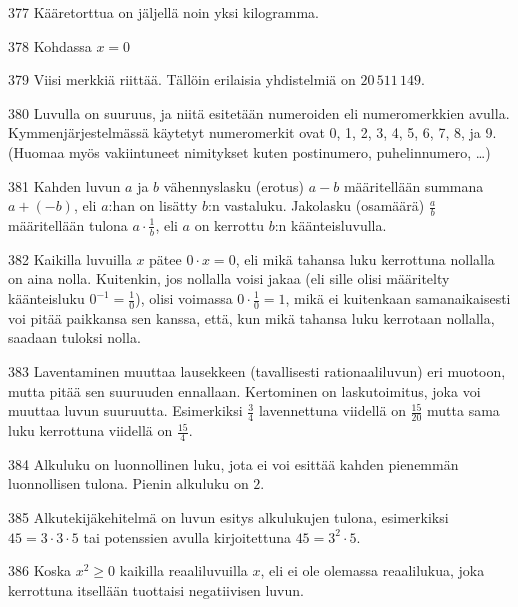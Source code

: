 \begin{Vastaus}{377}
Kääretorttua on jäljellä noin yksi kilogramma.
\end{Vastaus}
\begin{Vastaus}{378}
Kohdassa $x=0$
\end{Vastaus}
\begin{Vastaus}{379}
Viisi merkkiä riittää. Tällöin erilaisia yhdistelmiä on $20\,511\,149$.
\end{Vastaus}
\begin{Vastaus}{380}
Luvulla on suuruus, ja niitä esitetään numeroiden eli numeromerkkien avulla. Kymmenjärjestelmässä käytetyt numeromerkit ovat 0, 1, 2, 3, 4, 5, 6, 7, 8, ja 9. (Huomaa myös vakiintuneet nimitykset kuten postinumero, puhelinnumero, \ldots)
\end{Vastaus}
\begin{Vastaus}{381}
Kahden luvun $a$ ja $b$ vähennyslasku (erotus) $a-b$ määritellään summana $a+(-b)$, eli $a$:han on lisätty $b$:n vastaluku. Jakolasku (osamäärä) $\frac{a}{b}$ määritellään tulona $a\cdot \frac1b$, eli $a$ on kerrottu $b$:n käänteisluvulla.
\end{Vastaus}
\begin{Vastaus}{382}
Kaikilla luvuilla $x$ pätee $0 \cdot x = 0$, eli mikä tahansa luku kerrottuna nollalla on aina nolla. Kuitenkin, jos nollalla voisi jakaa (eli sille olisi määritelty käänteisluku $0^{-1}=\frac10$), olisi voimassa $0 \cdot\frac10 = 1$, mikä ei kuitenkaan samanaikaisesti voi pitää paikkansa sen kanssa, että, kun mikä tahansa luku kerrotaan nollalla, saadaan tuloksi nolla.
\end{Vastaus}
\begin{Vastaus}{383}
Laventaminen muuttaa lausekkeen (tavallisesti rationaaliluvun) eri muotoon, mutta pitää sen suuruuden ennallaan. Kertominen on laskutoimitus, joka voi muuttaa luvun suuruutta. Esimerkiksi $\frac34$ lavennettuna viidellä on $\frac{15}{20}$ mutta sama luku kerrottuna viidellä on $\frac{15}{4}$.
\end{Vastaus}
\begin{Vastaus}{384}
Alkuluku on luonnollinen luku, jota ei voi esittää kahden pienemmän luonnollisen tulona. Pienin alkuluku on $2$. %
\end{Vastaus}
\begin{Vastaus}{385}
Alkutekijäkehitelmä on luvun esitys alkulukujen tulona, esimerkiksi $45=3\cdot 3 \cdot 5$ tai potenssien avulla kirjoitettuna $45=3^2\cdot 5$.
\end{Vastaus}
\begin{Vastaus}{386}
Koska $x^2 \geq 0$ kaikilla reaaliluvuilla $x$, eli ei ole olemassa reaalilukua, joka kerrottuna itsellään tuottaisi negatiivisen luvun.
\end{Vastaus}
